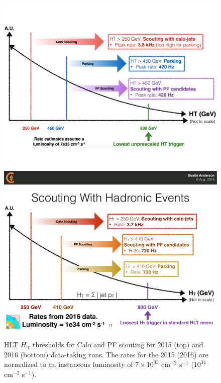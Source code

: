 \begin{figure}\centering
\includegraphics[width=.9\textwidth]{figs/cms/Scouting2015.pdf}\\
\includegraphics[width=.9\textwidth]{figs/cms/Scouting2016.pdf}
\caption{HLT $H_\mathrm{T}$ thresholds for Calo and PF scouting for
  2015 (top) and 2016 (bottom) data-taking runs. The
  rates for the 2015 (2016) are normalized to an instaneous luminosity
  of $7\times 10^{33}$ cm$^{-2}$ s$^{-1}$ ($10^{34}$ cm$^{-2}$
  s$^{-1}$). \label{fig:DataScouting}}
\end{figure}

